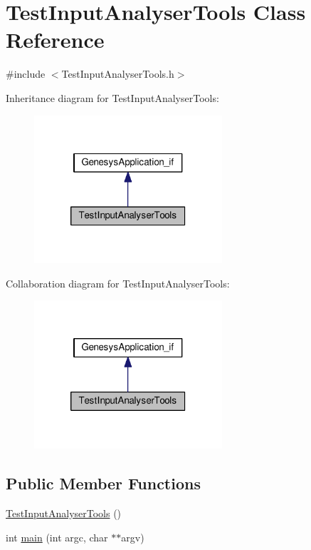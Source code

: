 \hypertarget{class_test_input_analyser_tools}{\section{Test\-Input\-Analyser\-Tools Class Reference}
\label{class_test_input_analyser_tools}
}


{\ttfamily \#include $<$Test\-Input\-Analyser\-Tools.\-h$>$}



Inheritance diagram for Test\-Input\-Analyser\-Tools\-:
\nopagebreak
\begin{figure}[H]
\begin{center}
\leavevmode
\includegraphics[width=198pt]{class_test_input_analyser_tools__inherit__graph}
\end{center}
\end{figure}


Collaboration diagram for Test\-Input\-Analyser\-Tools\-:
\nopagebreak
\begin{figure}[H]
\begin{center}
\leavevmode
\includegraphics[width=198pt]{class_test_input_analyser_tools__coll__graph}
\end{center}
\end{figure}
\subsection*{Public Member Functions}
\begin{DoxyCompactItemize}
\item 
\hyperlink{class_test_input_analyser_tools_a2ff911cb851cf82142f65d60a0eeea4e}{Test\-Input\-Analyser\-Tools} ()
\item 
int \hyperlink{class_test_input_analyser_tools_a8015a3024f29bddc865cb0b419214cd7}{main} (int argc, char $\ast$$\ast$argv)
\end{DoxyCompactItemize}


